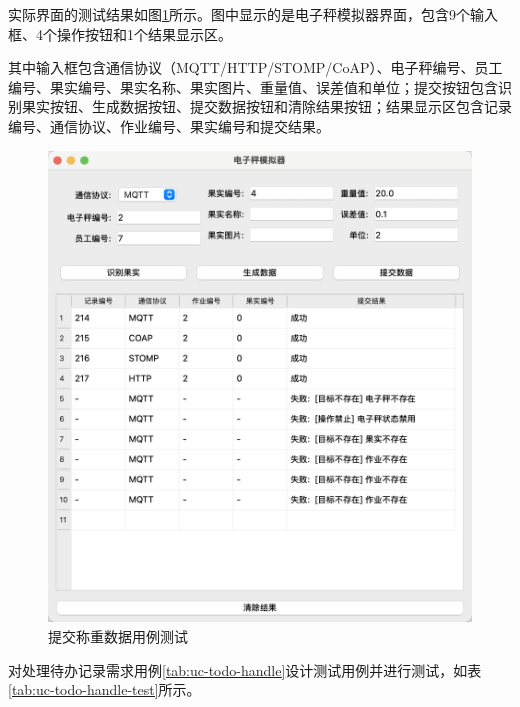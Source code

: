 实际界面的测试结果如图\ref{fig:weigh-submit-result}所示。图中显示的是电子秤模拟器界面，包含9个输入框、4个操作按钮和1个结果显示区。

其中输入框包含通信协议（MQTT/HTTP/STOMP/CoAP）、电子秤编号、员工编号、果实编号、果实名称、果实图片、重量值、误差值和单位；提交按钮包含识别果实按钮、生成数据按钮、提交数据按钮和清除结果按钮；结果显示区包含记录编号、通信协议、作业编号、果实编号和提交结果。

\begin{figure}[H]
    \centering
    \includegraphics[width=0.8\linewidth]{../result/weigh-submit-result.png}
    \caption{提交称重数据用例测试}
    \label{fig:weigh-submit-result}
\end{figure}

对处理待办记录需求用例\ref{tab:uc-todo-handle}设计测试用例并进行测试，如表\ref{tab:uc-todo-handle-test}所示。

